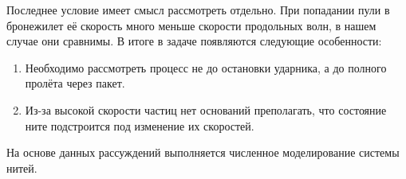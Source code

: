 Последнее условие имеет смысл рассмотреть отдельно.
При попадании пули в бронежилет её скорость много меньше скорости продольных волн, в нашем случае они сравнимы.
В итоге в задаче появляются следующие особенности:
\begin{enumerate}
    \item Необходимо рассмотреть процесс не до остановки ударника, а до полного пролёта через пакет.
    \item Из-за высокой скорости частиц нет оснований преполагать, что состояние ните подстроится под изменение их скоростей.
\end{enumerate}

На основе данных рассуждений выполняется численное моделирование системы нитей.